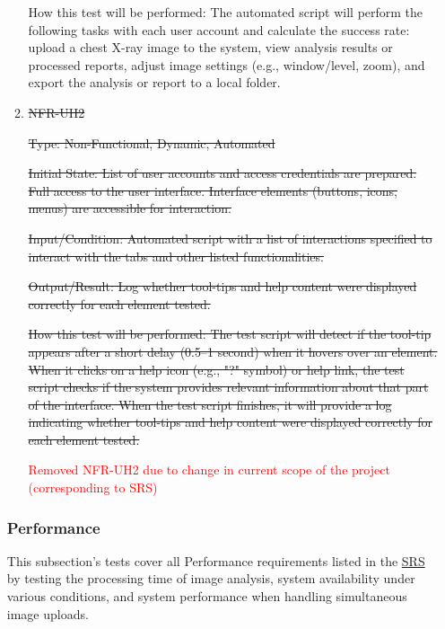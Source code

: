 \documentclass[12pt, titlepage]{article}
\begin{document}
\begin{enumerate}
\begin{enumerate}
  How this test will be performed: The automated script will perform the following tasks with each user account and calculate the success rate: upload a chest X-ray image to the system, view analysis results or processed reports, adjust image settings (e.g., window/level, zoom), and export the analysis or report to a local folder.
  
  \item{\sout{NFR-UH2}\\}\label{NFR-UH2}
  
  \sout{Type: Non-Functional, Dynamic, Automated}
  
  \sout{Initial State: List of user accounts and access credentials are prepared. Full access to the user interface. Interface elements (buttons, icons, menus) are accessible for interaction.}
  
  \sout{Input/Condition: Automated script with a list of interactions specified to interact with the tabs and other listed functionalities.}
  
  \sout{Output/Result: Log whether tool-tips and help content were displayed correctly for each element tested.}
  
  \sout{How this test will be performed: The test script will detect if the tool-tip appears after a short delay (0.5–1 second) when it hovers over an element. When it clicks on a help icon (e.g., "?" symbol) or help link, the test script checks if the system provides relevant information about that part of the interface. When the test script finishes, it will provide a log indicating whether tool-tips and help content were displayed correctly for each element tested.}
  
  \textcolor{red}{Removed NFR-UH2 due to change in current scope of the project (corresponding to SRS)}
  
  \end{enumerate}
  
  \subsubsection{Performance}
  
  This subsection's tests cover all Performance requirements listed in the 
  \href{https://github.com/RezaJodeiri/CXR-Capstone/blob/main/docs/SRS/SRS.pdf}{SRS} 
  \citep{SRS} by testing the processing time of image analysis, system availability under various conditions, and system performance when handling simultaneous image uploads.
  
  \begin{enumerate}
  

\end{enumerate}
\end{enumerate}
\end{document}
